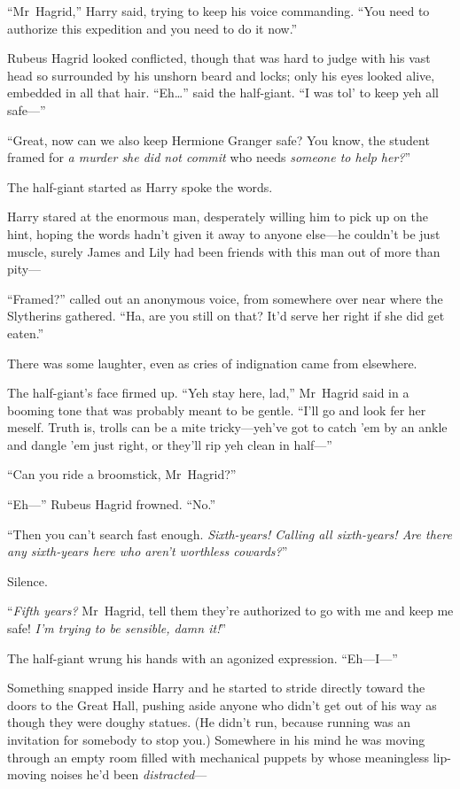 “Mr~Hagrid,” Harry said, trying to keep his voice commanding. “You need to authorize this expedition and you need to do it now.”

Rubeus Hagrid looked conflicted, though that was hard to judge with his vast head so surrounded by his unshorn beard and locks; only his eyes looked alive, embedded in all that hair. “Eh…” said the half-giant. “I was tol’ to keep yeh all safe—”

“Great, now can we also keep Hermione Granger safe? You know, the student framed for \emph{a murder she did not commit} who needs \emph{someone to help her?}”

The half-giant started as Harry spoke the words.

Harry stared at the enormous man, desperately willing him to pick up on the hint, hoping the words hadn’t given it away to anyone else—he couldn’t be just muscle, surely James and Lily had been friends with this man out of more than pity—

“Framed?” called out an anonymous voice, from somewhere over near where the Slytherins gathered. “Ha, are you still on that? It’d serve her right if she did get eaten.”

There was some laughter, even as cries of indignation came from elsewhere.

The half-giant’s face firmed up. “Yeh stay here, lad,” Mr~Hagrid said in a booming tone that was probably meant to be gentle. “I’ll go and look fer her meself. Truth is, trolls can be a mite tricky—yeh’ve got to catch ’em by an ankle and dangle ’em just right, or they’ll rip yeh clean in half—”

“Can you ride a broomstick, Mr~Hagrid?”

“Eh—” Rubeus Hagrid frowned. “No.”

“Then you can’t search fast enough. \emph{Sixth-years! Calling all sixth-years! Are there any sixth-years here who aren’t worthless cowards?}”

Silence.

“\emph{Fifth years?} Mr~Hagrid, tell them they’re authorized to go with me and keep me safe! \emph{I’m trying to be sensible, damn it!}”

The half-giant wrung his hands with an agonized expression. “Eh—I—”

Something snapped inside Harry and he started to stride directly toward the doors to the Great Hall, pushing aside anyone who didn’t get out of his way as though they were doughy statues. (He didn’t run, because running was an invitation for somebody to stop you.) Somewhere in his mind he was moving through an empty room filled with mechanical puppets by whose meaningless lip-moving noises he’d been \emph{distracted}—


